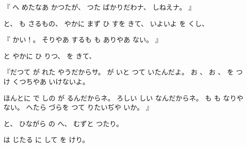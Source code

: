 %
『
へ
めたなあ
かつたが、
%
つた
ばかりだわナ、
%
しねえナ。%
』

%
と、
%
も
さるもの、
%
やかに
まず
ひ
すを
きて、
%
いよいよ%
を
くし、

%
『
かい！。
%
そりやあ
するも%
も
ありやあ
ない。
』

%
と
やかに
ひ
りつ、
%
を
きて、

%
『だつて
が
れた
やうだからサ。
%
が
いと
つて
いたんだよ。
%
お
、
%
お
、
%
を
つけ
くつちやあ
いけないよ。

%
ほんとに
で
しの
が
るんだからネ。
%
ろしい
しい
なんだからネ。
%
も
も
なりや
ない。
%
へたら
づらを
つて
りたいぢや
いか。
』

%
と、
%
ひながら
の
へ、
%
むずと
つたり。

%
は
じたる
に
して
を
けり。

